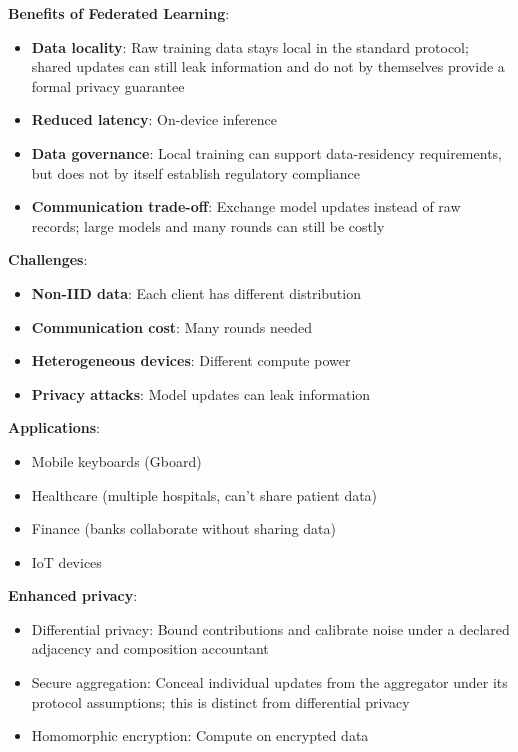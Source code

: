 \documentclass[11pt,twoside]{article}
\numberwithin{equation}{section}
\theoremstyle{plain}
\theoremstyle{definition}
\theoremstyle{remark}
\newenvironment{keyidea}{
  \begin{tcolorbox}[colback=yellow!5!white,
                    colframe=yellow!50!black,
                    title=Key Idea,
                    breakable,
                    enhanced,
                    sharp corners,
                    boxrule=0.8pt,
                    left=6pt, right=6pt, top=6pt, bottom=6pt]
}{
  \end{tcolorbox}
}
\begin{document}
\begin{keyidea}
\textbf{Benefits of Federated Learning}:
\begin{itemize}
\item \textbf{Data locality}: Raw training data stays local in the standard protocol; shared updates can still leak information and do not by themselves provide a formal privacy guarantee
\item \textbf{Reduced latency}: On-device inference
\item \textbf{Data governance}: Local training can support data-residency requirements, but does not by itself establish regulatory compliance
\item \textbf{Communication trade-off}: Exchange model updates instead of raw records; large models and many rounds can still be costly
\end{itemize}

\textbf{Challenges}:
\begin{itemize}
\item \textbf{Non-IID data}: Each client has different distribution
\item \textbf{Communication cost}: Many rounds needed
\item \textbf{Heterogeneous devices}: Different compute power
\item \textbf{Privacy attacks}: Model updates can leak information
\end{itemize}

\textbf{Applications}:
\begin{itemize}
\item Mobile keyboards (Gboard)
\item Healthcare (multiple hospitals, can't share patient data)
\item Finance (banks collaborate without sharing data)
\item IoT devices
\end{itemize}

\textbf{Enhanced privacy}:
\begin{itemize}
\item Differential privacy: Bound contributions and calibrate noise under a declared adjacency and composition accountant
\item Secure aggregation: Conceal individual updates from the aggregator under its protocol assumptions; this is distinct from differential privacy
\item Homomorphic encryption: Compute on encrypted data
\end{itemize}
\end{keyidea}
\end{document}
